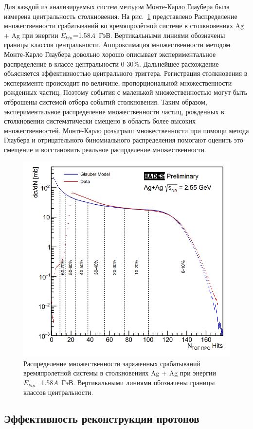 Для каждой из анализируемых систем методом Монте-Карло Глаубера была измерена центральность столкновения. 
На рис.~\ref{fig:hades_centrality} представлено Распределение множественности срабатываний во времяпролётной системе в столкновениях Ag + Ag при энергии $E_{kin}$=1.58$A$~ГэВ. Вертикальными линиями обозначены границы классов центральности.
Аппроксимация множественности методом Монте-Карло Глаубера довольно хорошо описывает экспериментальное распределение в классе центральности 0-30\%.
Дальнейшее расхождение объясняется эффективностью центрального триггера.
Регистрация столкновения в эксперименте происходит по величине, пропорциональной множественности рожденных частиц.
Поэтому события с маленькой множественностью могут быть отброшены системой отбора событий столкновения.
Таким образом, экспериментальное распределение множественности частиц, рожденных в столкновении систематически смещено в область более высоких множественностей.
Монте-Карло розыгрыш множественности при помощи метода Глаубера и отрицательного биномиального распределения помогают оценить это смещение и восстановить реальное распрделение множественности.  
%
\begin{figure}[ht]
\begin{center}
\includegraphics[width=0.55\linewidth]{images/hades_mult.png}
\caption{Распределение множественности заряженных срабатываний времяпролетной системы в столкновениях Ag + Ag при энергии $E_{kin}$=1.58$A$~ГэВ. Вертикальными линиями обозначены границы классов центральности.}
\label{fig:hades_centrality}
\end{center}
\end{figure}


\subsection{Эффективность реконструкции протонов}

